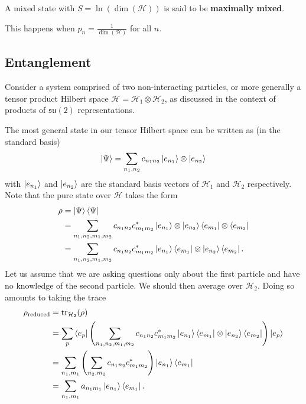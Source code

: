 \documentclass[12pt, a4paper]{article}
\newcommand{\hilbert}{\mathcal H}
\begin{document}
\begin{definition}
    A mixed state with \(S = \ln(\dim(\hilbert))\) is said to be \textbf{maximally mixed}.
\end{definition}

\begin{example}
    This happens when \(p_n = \frac{1}{\dim(\hilbert)}\) for all \(n\).
\end{example}

\subsection{Entanglement}

Consider a system comprised of two non-interacting particles, or more generally a tensor product Hilbert space \( \mathcal{H} = \mathcal{H}_1 \otimes \mathcal{H}_2 \), as discussed in the context of products of \(\mathfrak{su}(2)\) representations.

\noindent The most general state in our tensor Hilbert space can be written as (in the standard basis)
\[\ket{\Psi} = \sum_{n_1,n_2} c_{n_1 n_2} \ket{e_{n_1}} \otimes \ket{e_{n_2}}\]
with \(\ket{e_{n_1}}\) and \(\ket{e_{n_2}}\) are the standard basis vectors of \(\hilbert_1\) and \(\hilbert_2\) respectively. Note that the pure state over \(\hilbert\) takes the form 
\[\begin{aligned}
    \rho &= \ket{\Psi}\bra{\Psi} \\
    &= \sum_{n_1,n_2,m_1,m_2} c_{n_1 n_2} c^*_{m_1 m_2} \ket{e_{n_1}} \otimes \ket{e_{n_2}} \bra{e_{m_1}} \otimes \bra{e_{m_2}} \\ 
    &=\sum_{n_1,n_2,m_1,m_2} c_{n_1 n_2} c^*_{m_1 m_2} \ket{e_{n_1}} \bra{e_{m_1}}\otimes \ket{e_{n_2}} \bra{e_{m_2}}.
\end{aligned}\]
Let us assume that we are asking questions only about the first particle and have no knowledge of the second particle. We should then average over \(\hilbert_2\). Doing so amounts to taking the trace
\[\begin{aligned}
    \rho_{\text{reduced}} &= \text{tr}_{\hilbert_2} (\rho) \\
    &=  \sum_{p} \bra{e_p}\left( \sum_{n_1,n_2,m_1,m_2} c_{n_1 n_2} c^*_{m_1 m_2} \ket{e_{n_1}} \bra{e_{m_1}}\otimes \ket{e_{n_2}} \bra{e_{m_2}} \right) \ket{e_p} \\
    &= \sum_{n_1,m_1} \left( \sum_{n_2,m_2} c_{n_1 n_2} c^*_{m_1 m_2}\right) \ket{e_{n_1}} \bra{e_{m_1}} \\
    &= \sum_{n_1 ,m_1} a_{n_1 m_1}\ket{e_{n_1}} \bra{e_{m_1}}.
\end{aligned}\]
\end{document}
